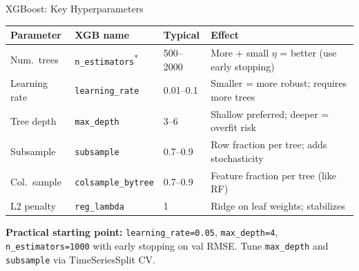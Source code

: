 \documentclass[aspectratio=169, 10pt]{beamer}
\begin{document}
\begin{frame}{XGBoost: Key Hyperparameters}
  \begin{center}
  \footnotesize
  \begin{tabular}{p{2.6cm}p{2.5cm}p{2.1cm}p{3.9cm}}
    \toprule
    \textbf{Parameter} & \textbf{XGB name} & \textbf{Typical} & \textbf{Effect} \\
    \midrule
    Num.\ trees
      & \texttt{n\_estimators}\textsuperscript{*}
      & 500--2000
      & More + small $\eta$ = better (use early stopping) \\
    Learning rate
      & \texttt{learning\_rate}
      & 0.01--0.1
      & Smaller = more robust; requires more trees \\
    Tree depth
      & \texttt{max\_depth}
      & 3--6
      & Shallow preferred; deeper = overfit risk \\
    Subsample
      & \texttt{subsample}
      & 0.7--0.9
      & Row fraction per tree; adds stochasticity \\
    Col.\ sample
      & \texttt{colsample\_bytree}
      & 0.7--0.9
      & Feature fraction per tree (like RF) \\
    L2 penalty
      & \texttt{reg\_lambda}
      & 1
      & Ridge on leaf weights; stabilizes \\
    \bottomrule
  \end{tabular}
  \end{center}

  \vspace{2pt}
  \begin{keybox}
    \footnotesize
    \textbf{Practical starting point:}
    \texttt{learning\_rate=0.05}, \texttt{max\_depth=4},
    \texttt{n\_estimators=1000} with early stopping on val RMSE.
    Tune \texttt{max\_depth} and \texttt{subsample} via TimeSeriesSplit CV.
  \end{keybox}

  \vspace{-2pt}
\end{frame}
\end{document}
